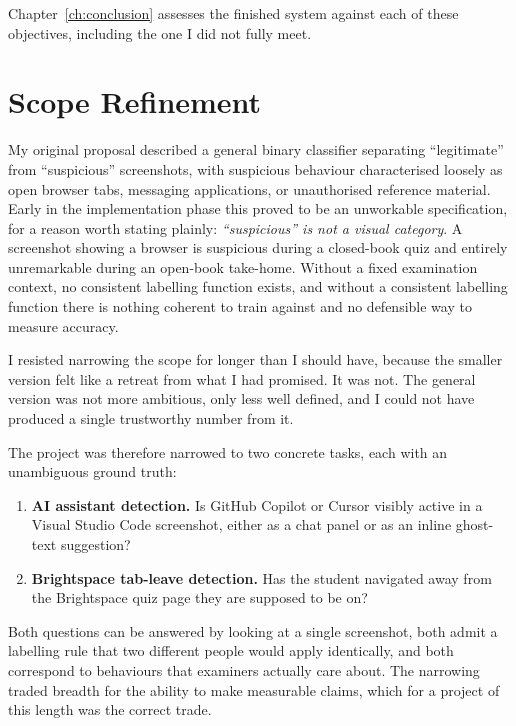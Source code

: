 \documentclass[12pt,oneside]{report}
\begin{document}
Chapter~\ref{ch:conclusion} assesses the finished system against each of these
objectives, including the one I did not fully meet.

\section{Scope Refinement}
\label{sec:scope}

My original proposal described a general binary classifier separating
``legitimate'' from ``suspicious'' screenshots, with suspicious behaviour
characterised loosely as open browser tabs, messaging applications, or
unauthorised reference material. Early in the implementation phase this proved
to be an unworkable specification, for a reason worth stating plainly:
\emph{``suspicious'' is not a visual category}. A screenshot showing a browser
is suspicious during a closed-book quiz and entirely unremarkable during an
open-book take-home. Without a fixed examination context, no consistent
labelling function exists, and without a consistent labelling function there is
nothing coherent to train against and no defensible way to measure accuracy.

I resisted narrowing the scope for longer than I should have, because the
smaller version felt like a retreat from what I had promised. It was not. The
general version was not more ambitious, only less well defined, and I could not
have produced a single trustworthy number from it.

The project was therefore narrowed to two concrete tasks, each with an
unambiguous ground truth:

\begin{enumerate}[itemsep=2pt]
  \item \textbf{AI assistant detection.} Is GitHub Copilot or Cursor visibly
        active in a Visual Studio Code screenshot, either as a chat panel or as
        an inline ghost-text suggestion?
  \item \textbf{Brightspace tab-leave detection.} Has the student navigated
        away from the Brightspace quiz page they are supposed to be on?
\end{enumerate}

Both questions can be answered by looking at a single screenshot, both admit a
labelling rule that two different people would apply identically, and both
correspond to behaviours that examiners actually care about. The narrowing
traded breadth for the ability to make measurable claims, which for a project
of this length was the correct trade.
\end{document}
